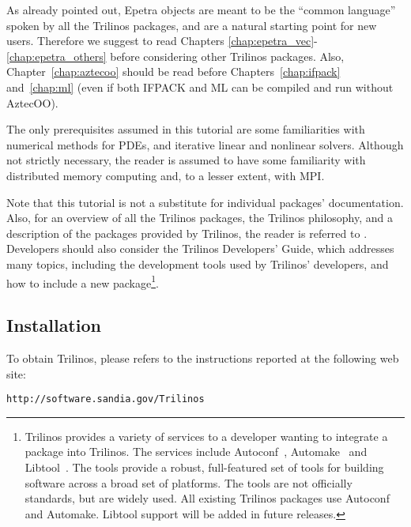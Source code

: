 \begin{remark}
  As already pointed out, Epetra objects are meant to be the ``common
  language'' spoken by all the Trilinos packages, and are a natural
  starting point for new users. Therefore we suggest to read Chapters
  \ref{chap:epetra_vec}-\ref{chap:epetra_others} before considering
  other Trilinos packages. Also, Chapter~\ref{chap:aztecoo} should be
  read before Chapters~\ref{chap:ifpack} and~\ref{chap:ml} (even if both
  IFPACK and ML can be compiled and run without AztecOO).
\end{remark}

The only prerequisites assumed in this tutorial are some familiarities
with numerical methods for PDEs, and iterative linear and nonlinear
solvers. Although not strictly necessary, the reader is assumed to have
some familiarity with distributed memory computing and, to a lesser
extent, with MPI.

\smallskip

Note that this tutorial is not a substitute for individual packages'
documentation. Also, for an overview of all the Trilinos packages, the
Trilinos philosophy, and a description of the packages provided by
Trilinos, the reader is referred to \cite{Trilinos-Overview}.
Developers should also consider the Trilinos Developers' Guide, which
addresses many topics, including the development tools used by Trilinos'
developers, and how to include a new package\footnote{ Trilinos provides
  a variety of services to a developer wanting to integrate a package
  into Trilinos.  The services include Autoconf~\cite{Autoconf},
  Automake~\cite{Automake} and Libtool~\cite{Libtool}. The tools provide
  a robust, full-featured set of tools for building software across a
  broad set of platforms.  The tools are not officially standards, but
  are widely used.  All existing Trilinos packages use Autoconf and
  Automake.  Libtool support will be added in future releases.}.


\subsection{Installation}
\label{sec:installing}

To obtain Trilinos, please refers to the instructions reported at the
following web site:
\begin{verbatim}
http://software.sandia.gov/Trilinos
\end{verbatim}


